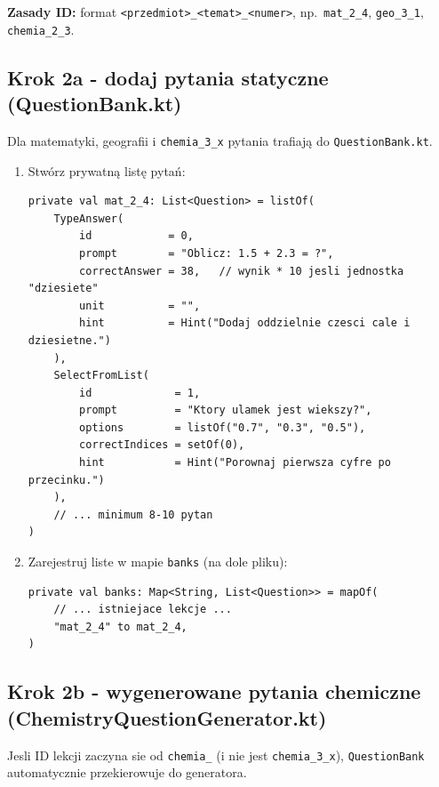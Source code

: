 \documentclass[a4paper,11pt]{article}
\begin{document}
\textbf{Zasady ID:} format \texttt{<przedmiot>\_<temat>\_<numer>}, np.\ \texttt{mat\_2\_4}, \texttt{geo\_3\_1}, \texttt{chemia\_2\_3}.

\subsection{Krok 2a - dodaj pytania statyczne (QuestionBank.kt)}

Dla matematyki, geografii i \texttt{chemia\_3\_x} pytania trafiają do \texttt{QuestionBank.kt}.

\begin{enumerate}
  \item Stwórz prywatną listę pytań:
\begin{lstlisting}
private val mat_2_4: List<Question> = listOf(
    TypeAnswer(
        id            = 0,
        prompt        = "Oblicz: 1.5 + 2.3 = ?",
        correctAnswer = 38,   // wynik * 10 jesli jednostka "dziesiete"
        unit          = "",
        hint          = Hint("Dodaj oddzielnie czesci cale i dziesietne.")
    ),
    SelectFromList(
        id             = 1,
        prompt         = "Ktory ulamek jest wiekszy?",
        options        = listOf("0.7", "0.3", "0.5"),
        correctIndices = setOf(0),
        hint           = Hint("Porownaj pierwsza cyfre po przecinku.")
    ),
    // ... minimum 8-10 pytan
)
\end{lstlisting}

  \item Zarejestruj liste w mapie \texttt{banks} (na dole pliku):
\begin{lstlisting}
private val banks: Map<String, List<Question>> = mapOf(
    // ... istniejace lekcje ...
    "mat_2_4" to mat_2_4,
)
\end{lstlisting}
\end{enumerate}

\subsection{Krok 2b - wygenerowane pytania chemiczne (ChemistryQuestionGenerator.kt)}

Jesli ID lekcji zaczyna sie od \texttt{chemia\_} (i nie jest \texttt{chemia\_3\_x}),
\texttt{QuestionBank} automatycznie przekierowuje do generatora.
\end{document}
